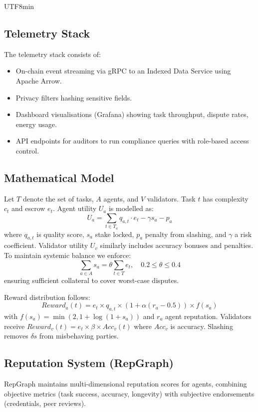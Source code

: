 \documentclass[11pt]{article}
\begin{document}
\begin{CJK}{UTF8}{min}
\subsection{Telemetry Stack}
The telemetry stack consists of:
\begin{itemize}[noitemsep]
  \item On-chain event streaming via gRPC to an Indexed Data Service using Apache Arrow.
  \item Privacy filters hashing sensitive fields.
  \item Dashboard visualisations (Grafana) showing task throughput, dispute rates, energy usage.
  \item API endpoints for auditors to run compliance queries with role-based access control.
\end{itemize}

\subsection{Mathematical Model}
Let $T$ denote the set of tasks, $A$ agents, and $V$ validators. Task $t$ has complexity $c_t$ and escrow $e_t$. Agent utility $U_a$ is modelled as:
\begin{equation}
U_a = \sum_{t \in T_a} q_{a,t}\cdot e_t - \gamma s_a - p_a\label{eq:agent-utility}
\end{equation}
where $q_{a,t}$ is quality score, $s_a$ stake locked, $p_a$ penalty from slashing, and $\gamma$ a risk coefficient. Validator utility $U_v$ similarly includes accuracy bonuses and penalties. To maintain systemic balance we enforce:
\begin{equation}
\sum_{a \in A} s_a = \theta \sum_{t \in T} e_t,\quad 0.2 \leq \theta \leq 0.4
\end{equation}
ensuring sufficient collateral to cover worst-case disputes.

Reward distribution follows:
\begin{equation}
Reward_a(t) = e_t \times q_{a,t} \times \left(1 + \alpha (r_a - 0.5)\right) \times f(s_a)
\end{equation}
with $f(s_a) = \min(2, 1 + \log(1+s_a))$ and $r_a$ agent reputation. Validators receive $Reward_v(t) = e_t \times \beta \times Acc_v(t)$ where $Acc_v$ is accuracy. Slashing removes $\delta s$ from misbehaving parties.

\subsection{Reputation System (RepGraph)}
\label{sec:reputation}
RepGraph maintains multi-dimensional reputation scores for agents, combining objective metrics (task success, accuracy, longevity) with subjective endorsements (credentials, peer reviews).


\end{CJK}
\end{document}
